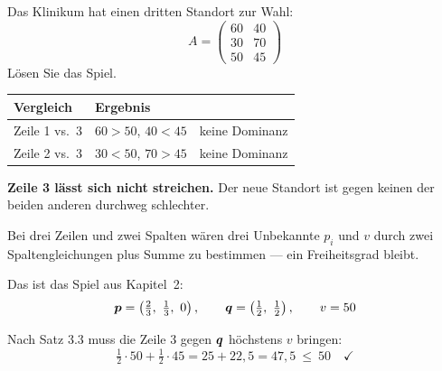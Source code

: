 \begin{aufgabe}
Das Klinikum hat einen dritten Standort zur Wahl:
\[ A = \begin{pmatrix} 60 & 40\\ 30 & 70\\ 50 & 45 \end{pmatrix} \]
Lösen Sie das Spiel.

\loesung
{}
\begin{center}
\renewcommand{\arraystretch}{1.48}
\begin{tabular}{@{}P{2.6cm}P{2.6cm}P{2.6cm}@{}}
\toprule
\textbf{Vergleich} & \textbf{Ergebnis} & \\
\midrule
Zeile 1 vs.\ 3 & $60>50$, $40<45$ & keine Dominanz\\
Zeile 2 vs.\ 3 & $30<50$, $70>45$ & keine Dominanz\\
\bottomrule
\end{tabular}
\end{center}

\begin{center}
\begin{minipage}{0.9\textwidth}
\textbf{Zeile 3 lässt sich nicht streichen.} Der neue Standort ist gegen keinen der beiden anderen durchweg schlechter.
\end{minipage}
\end{center}

Bei drei Zeilen und zwei Spalten wären drei Unbekannte $p_i$ und $v$ durch zwei Spaltengleichungen plus Summe zu bestimmen --- ein Freiheitsgrad bleibt.

\begin{center}
\begin{minipage}{0.88\textwidth}
\end{minipage}
\end{center}

Das ist das Spiel aus Kapitel~2:
\[ \vek p = \left(\tfrac23,\ \tfrac13,\ 0\right), \qquad \vek q = \left(\tfrac12,\ \tfrac12\right), \qquad v = 50 \]

Nach Satz 3.3 muss die  Zeile 3 gegen $\boldsymbol{q}$ höchstens $v$ bringen:
\[ \tfrac12\cdot50 + \tfrac12\cdot45 = 25 + 22{,}5 = 47{,}5 \ \le\ 50 \quad \checkmark \]


\end{aufgabe}

